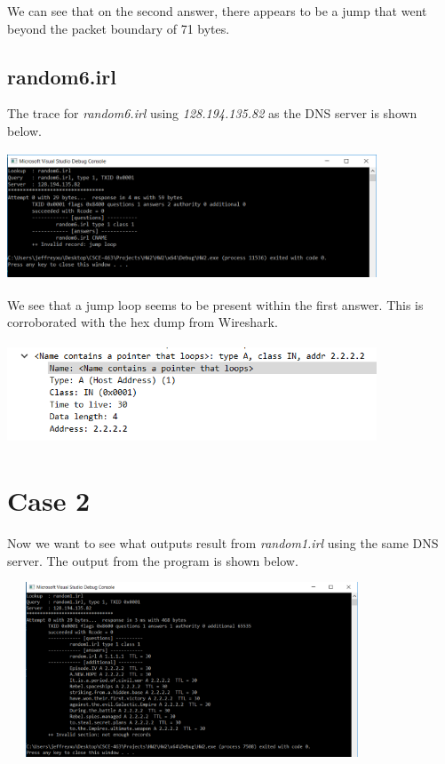\documentclass[12pt]{article}
\begin{document}
We can see that on the second answer, there appears to be a jump that went beyond the packet boundary of 71 bytes. 

\subsection{random6.irl}

The trace for \emph{random6.irl} using \emph{128.194.135.82} as the DNS server is shown below.

\begin{center}
\includegraphics[width=11cm, height=3.8cm]{random6.irl}
\end{center}

We see that a jump loop seems to be present within the first answer. This is corroborated with the hex dump from Wireshark. 

\begin{center}
\includegraphics[width=11cm, height=3cm]{random6.irlWireShark}
\end{center}

\section{Case 2}

Now we want to see what outputs result from \emph{random1.irl} using the same DNS server. The output from the program is shown below.

\begin{center}
\includegraphics[width=11cm, height=5.2cm]{random1.irl}
\end{center}
\end{document}

